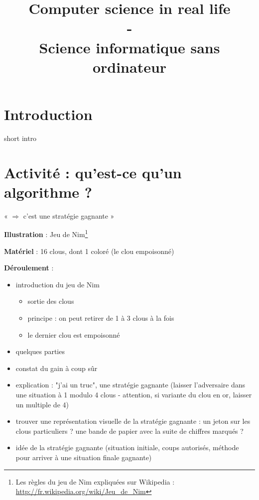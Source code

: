 \documentclass[a4paper]{article}
\title{Computer science in real life\\ -\\ Science informatique sans ordinateur}
\newcommand{\titre}[1]{\medskip\noindent\textbf{#1} : }
\newcommand{\illustration}{\titre{Illustration}}
\newcommand{\materiel}{\titre{Matériel}}
\newcommand{\deroulement}{\titre{Déroulement}}
\begin{document}
\date{}

\maketitle


\section{Introduction}
short intro

\section{Activité : qu'est-ce qu'un algorithme ?}
« $\Rightarrow$ c'est une stratégie gagnante »

\illustration Jeu de Nim\footnote{Les règles du jeu de Nim expliquées sur
Wikipedia : \url{http://fr.wikipedia.org/wiki/Jeu_de_Nim}}

\materiel 16 clous, dont 1 coloré (le clou empoisonné)

\deroulement
\begin{itemize}
\item introduction du jeu de Nim
\begin{itemize}
\item sortie des clous
\item principe : on peut retirer de 1 à 3 clous à la fois
\item le dernier clou est empoisonné
\end{itemize}
\item quelques parties
\item constat du gain à coup sûr
\item explication : "j'ai un truc", une stratégie gagnante (laisser l'adversaire dans une situation à 1 modulo 4 clous - attention, si variante du clou en or, laisser un multiple de 4)
\item trouver une représentation visuelle de la stratégie gagnante : un jeton sur les clous particuliers ? une bande de papier avec la suite de chiffres marqués ?
\item idée de la stratégie gagnante (situation initiale, coups autorisés, méthode pour arriver à une situation finale gagnante)
\end{itemize}
\end{document}
